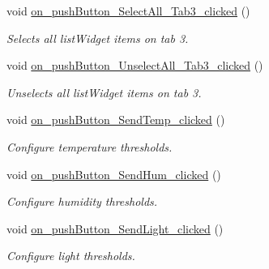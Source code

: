 \begin{DoxyCompactItemize}
\mbox{\label{classMainWindow_a5799237eb83637aa8aca620f2043da5a}} 
void \hyperlink{classMainWindow_a5799237eb83637aa8aca620f2043da5a}{on\+\_\+push\+Button\+\_\+\+Select\+All\+\_\+\+Tab3\+\_\+clicked} ()
\begin{DoxyCompactList}\small\item\em Selects all list\+Widget items on tab 3. \end{DoxyCompactList}\item 
\mbox{\label{classMainWindow_ae9a30c4c371e2c2ce6f7354875368351}} 
void \hyperlink{classMainWindow_ae9a30c4c371e2c2ce6f7354875368351}{on\+\_\+push\+Button\+\_\+\+Unselect\+All\+\_\+\+Tab3\+\_\+clicked} ()
\begin{DoxyCompactList}\small\item\em Unselects all list\+Widget items on tab 3. \end{DoxyCompactList}\item 
\mbox{\label{classMainWindow_ae63340fe5e458e1160709c81a1ca3956}} 
void \hyperlink{classMainWindow_ae63340fe5e458e1160709c81a1ca3956}{on\+\_\+push\+Button\+\_\+\+Send\+Temp\+\_\+clicked} ()
\begin{DoxyCompactList}\small\item\em Configure temperature thresholds. \end{DoxyCompactList}\item 
\mbox{\label{classMainWindow_a54f3e0176f218037a3901e3c24a93338}} 
void \hyperlink{classMainWindow_a54f3e0176f218037a3901e3c24a93338}{on\+\_\+push\+Button\+\_\+\+Send\+Hum\+\_\+clicked} ()
\begin{DoxyCompactList}\small\item\em Configure humidity thresholds. \end{DoxyCompactList}\item 
\mbox{\label{classMainWindow_a083c03ea7e282b677e5d2d9108ccd5e5}} 
void \hyperlink{classMainWindow_a083c03ea7e282b677e5d2d9108ccd5e5}{on\+\_\+push\+Button\+\_\+\+Send\+Light\+\_\+clicked} ()
\begin{DoxyCompactList}\small\item\em Configure light thresholds. \end{DoxyCompactList}\item 
\mbox{\label{classMainWindow_abb4b4fb07a781d7e69e97be136406895}} 

\end{DoxyCompactItemize}
